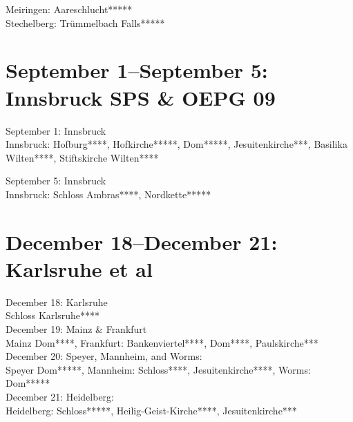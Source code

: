 Meiringen: Aareschlucht*****\\
Stechelberg: Tr\"ummelbach Falls*****

\section{September 1--September 5: Innsbruck SPS \& OEPG 09}
\label{2009:Innsbruck}

September 1: Innsbruck\\

Innsbruck: Hofburg****, Hofkirche*****, Dom*****, Jesuitenkirche***, Basilika Wilten****, Stiftskirche Wilten****

September 5: Innsbruck\\

Innsbruck: Schloss Ambras****, Nordkette*****

\section{December 18--December 21: Karlsruhe et al}

December 18: Karlsruhe\\
Schloss Karlsruhe****\\

December 19: Mainz \& Frankfurt\\
Mainz Dom****, Frankfurt: Bankenviertel****, Dom****, Paulskirche***\\

December 20: Speyer, Mannheim, and Worms:\\
Speyer Dom*****, Mannheim: Schloss****, Jesuitenkirche****, Worms: Dom*****\\

December 21: Heidelberg:\\
Heidelberg: Schloss*****, Heilig-Geist-Kirche****, Jesuitenkirche***
